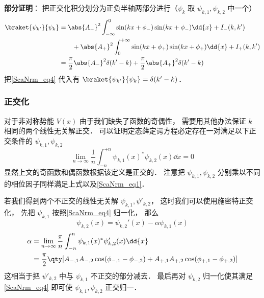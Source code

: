 \textbf{部分证明}： 把正交化积分划分为正负半轴两部分进行（$\psi_{k}$ 取 $\psi_{k,1}, \psi_{k,2}$ 中一个）
\begin{equation}
\begin{aligned}
\braket{\psi_{k'}}{\psi_{k}} &= \abs{A_-}^2\int_{-\infty}^0 \sin(kx + \phi_{-})\sin(kx + \phi_{-}) \dd{x} + I_-(k,k')\\
&\qquad+ \abs{A_+}^2\int_0^{+\infty} \sin(kx + \phi_{+})\sin(kx + \phi_{+}) \dd{x}   + I_+(k,k')\\
&= \frac{\pi}{2}\abs{A_-}^2\delta(k'-k) + \frac{\pi}{2}\abs{A_+}^2 \delta(k'-k)
\end{aligned}
\end{equation}
把\autoref{ScaNrm_eq4} 代入有 $\braket{\psi_{k'}}{\psi_{k}} = \delta(k'-k)$．

\subsubsection{正交化}
对于非对称势能 $V(x)$ 由于我们缺失了函数的奇偶性， 需要用其他办法保证 $k$ 相同的两个线性无关解正交． 可以证明定态薛定谔方程必定存在一对满足以下正交条件的 $\psi_{k,1}, \psi_{k,2}$
\begin{equation}\label{ScaNrm_eq7}
\lim_{n\to\infty}\frac{1}{n}\int_{-n}^{+n} \psi_{k,1}(x)^* \psi_{k,2}(x) \dd{x} = 0
\end{equation}
显然上文的奇函数和偶函数根据该定义是正交的． 注意把 $\psi_{k,1}, \psi_{k,2}$ 分别乘以不同的相位因子同样满足上式以及\autoref{ScaNrm_eq1}．

若我们得到两个不正交的线性无关解 $\psi_{k,1}, \psi'_{k,2}$， 这时我们可以使用施密特正交化， 先把 $\psi_{k,1}$ 按照\autoref{ScaNrm_eq4} 归一化， 那么
\begin{equation}
\psi_{k,2}(x) = \psi_{k,2}'(x) - \alpha \psi_{k,1}(x)
\end{equation}
\begin{equation}\label{ScaNrm_eq5}
\begin{aligned}
\alpha &= \lim_{n\to\infty} \frac{\pi}{n} \int_{-n}^n \psi_{k,1}(x)^* \psi'_{k,2}(x) \dd{x}\\
&= \frac{\pi}{2} \qty[A_{-,1}A_{-,2}\cos(\phi_{-,1}-\phi_{-,2}) + A_{+,1}A_{+,2}\cos(\phi_{+,1}-\phi_{+,2})]
\end{aligned}
\end{equation}
这相当于把 $\psi'_{k,2}$ 中与 $\psi_{k,1}$ 不正交的部分减去． 最后再对 $\psi_{k,2}$ 归一化使其满足\autoref{ScaNrm_eq4} 即可使 $\psi_{k,1}, \psi_{k,2}$ 正交归一．

